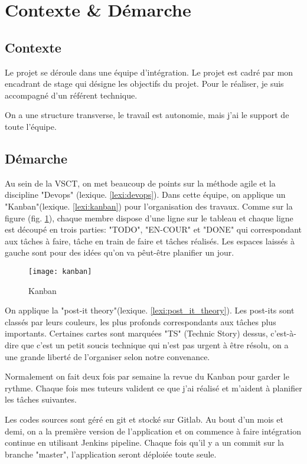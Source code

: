 \section{Contexte \& Démarche}
\subsection{Contexte}
Le projet se déroule dans une équipe d'intégration.
Le projet est cadré par mon encadrant de stage qui désigne les objectifs du projet.
Pour le réaliser, je suis accompagné d'un référent technique.

On a une structure transverse, le travail est autonomie, mais j'ai le support de toute l'équipe.

\subsection{Démarche}
Au sein de la VSCT, on met beaucoup de points sur la méthode agile et la discipline "Devops" (lexique. \ref{lexi:devops}).
Dans cette équipe, on applique un "Kanban"(lexique. \ref{lexi:kanban}) pour l'organisation des travaux.
Comme sur la figure (fig. \ref{fig:kanban}), chaque membre dispose d'une ligne sur le tableau et chaque ligne est découpé en trois parties: "TODO", "EN-COUR" et "DONE" qui correspondant aux tâches à faire, tâche en train de faire et tâches réalisés.
Les espaces laissés à gauche sont pour des idées qu'on va pêut-être planifier un jour.

\begin{figure}[ht]
\centering
\texttt{[image: kanban]}
\caption{Kanban}
\label{fig:kanban}
\end{figure}

On applique la "post-it theory"(lexique. \ref{lexi:post_it_theory}).
Les post-its sont classés par leurs couleurs, les plus profonds correspondants aux tâches plus importants.
Certaines cartes sont marquées "TS" (Technic Story) dessus, c'est-à-dire que c'est un petit soucis technique qui n'est pas urgent à être résolu, on a une grande liberté de l'organiser selon notre convenance.

Normalement on fait  deux fois par semaine la revue du Kanban pour garder le rythme.
Chaque fois mes tuteurs valident ce que j'ai réalisé et m'aident à planifier les tâches suivantes.

Les codes sources sont géré en git et stocké sur Gitlab. Au bout d'un mois et demi, on a la première version de l'application et on commence à faire intégration continue en utilisant Jenkins pipeline.
Chaque fois qu'il y a un commit sur la branche "master", l'application seront déploiée toute seule.

\clearpage
